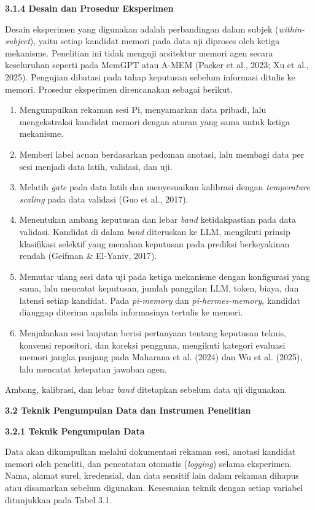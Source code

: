 \documentclass[12pt,a4paper]{article}
\newcommand{\asing}[1]{\textit{#1}}
\newcommand{\pim}{\textit{pi-memory}}
\newcommand{\phm}{\textit{pi-hermes-memory}}
\newcommand{\subbab}[2]{%
  \par\vspace{0.8em}\phantomsection\label{#2}%
  \noindent\textbf{#1}\par\nopagebreak\vspace{0.3em}}
\newcommand{\subsubbab}[2]{%
  \par\vspace{0.5em}\phantomsection\label{#2}%
  \noindent\textbf{#1}\par\nopagebreak\vspace{0.2em}}
\begin{document}
\subsubbab{3.1.4 Desain dan Prosedur Eksperimen}{sec:3.1.4}

Desain eksperimen yang digunakan adalah perbandingan dalam subjek (\asing{within-subject}), yaitu setiap kandidat memori pada data uji diproses oleh ketiga mekanisme. Penelitian ini tidak menguji arsitektur memori agen secara keseluruhan seperti pada MemGPT atau A-MEM (Packer et al., 2023; Xu et al., 2025). Pengujian dibatasi pada tahap keputusan sebelum informasi ditulis ke memori. Prosedur eksperimen direncanakan sebagai berikut.
\begin{enumerate}[leftmargin=1.25cm]
\item Mengumpulkan rekaman sesi Pi, menyamarkan data pribadi, lalu mengekstraksi kandidat memori dengan aturan yang sama untuk ketiga mekanisme.
\item Memberi label acuan berdasarkan pedoman anotasi, lalu membagi data per sesi menjadi data latih, validasi, dan uji.
\item Melatih \asing{gate} pada data latih dan menyesuaikan kalibrasi dengan \asing{temperature scaling} pada data validasi (Guo et al., 2017).
\item Menentukan ambang keputusan dan lebar \asing{band} ketidakpastian pada data validasi. Kandidat di dalam \asing{band} diteruskan ke LLM, mengikuti prinsip klasifikasi selektif yang menahan keputusan pada prediksi berkeyakinan rendah (Geifman \& El-Yaniv, 2017).
\item Memutar ulang sesi data uji pada ketiga mekanisme dengan konfigurasi yang sama, lalu mencatat keputusan, jumlah panggilan LLM, token, biaya, dan latensi setiap kandidat. Pada \pim{} dan \phm{}, kandidat dianggap diterima apabila informasinya tertulis ke memori.
\item Menjalankan sesi lanjutan berisi pertanyaan tentang keputusan teknis, konvensi repositori, dan koreksi pengguna, mengikuti kategori evaluasi memori jangka panjang pada Maharana et al. (2024) dan Wu et al. (2025), lalu mencatat ketepatan jawaban agen.
\end{enumerate}

Ambang, kalibrasi, dan lebar \asing{band} ditetapkan sebelum data uji digunakan.

\subbab{3.2 Teknik Pengumpulan Data dan Instrumen Penelitian}{sec:3.2}

\subsubbab{3.2.1 Teknik Pengumpulan Data}{sec:3.2.1}

Data akan dikumpulkan melalui dokumentasi rekaman sesi, anotasi kandidat memori oleh peneliti, dan pencatatan otomatis (\asing{logging}) selama eksperimen. Nama, alamat surel, kredensial, dan data sensitif lain dalam rekaman dihapus atau disamarkan sebelum digunakan. Kesesuaian teknik dengan setiap variabel ditunjukkan pada Tabel 3.1.
\end{document}
